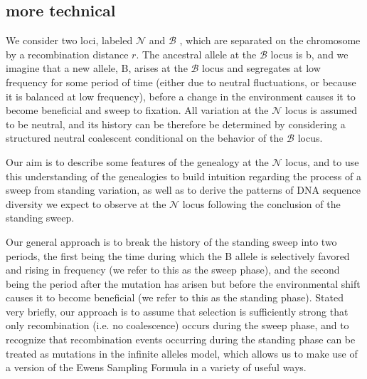 \documentclass[a4paper,10pt]{article}
\newcommand{\fancyN}{$\mathcal N$ }
\newcommand{\fancyB}{$\mathcal B$ }
\begin{document}
\subsection{more technical}



We consider two loci, labeled \fancyN and \fancyB, which are separated on the chromosome by a recombination distance $r$. The ancestral allele at the \fancyB locus is b, and we imagine that a new allele, B, arises at the \fancyB locus and segregates at low frequency for some period of time (either due to neutral fluctuations, or because it is balanced at low frequency), before a change in the environment causes it to become beneficial and sweep to fixation. All variation at the \fancyN locus is assumed to be neutral, and its history can be therefore be determined by considering a structured neutral coalescent conditional on the behavior of the \fancyB locus.

Our aim is to describe some features of the genealogy at the \fancyN locus, and to use this understanding of the genealogies to build intuition regarding the process of a sweep from standing variation, as well as to derive the patterns of DNA sequence diversity we expect to observe at the \fancyN locus following the conclusion of the standing sweep.

Our general approach is to break the history of the standing sweep into two periods, the first being the time during which the B allele is selectively favored and rising in frequency (we refer to this as the sweep phase), and the second being the period after the mutation has arisen but before the environmental shift causes it to become beneficial (we refer to this as the standing phase). Stated very briefly, our approach is to assume that selection is sufficiently strong that only recombination (i.e. no coalescence) occurs during the sweep phase, and to recognize that recombination events occurring during the standing phase can be treated as mutations in the infinite alleles model, which allows us to make use of a version of the Ewens Sampling Formula in a variety of useful ways. %
\end{document}
